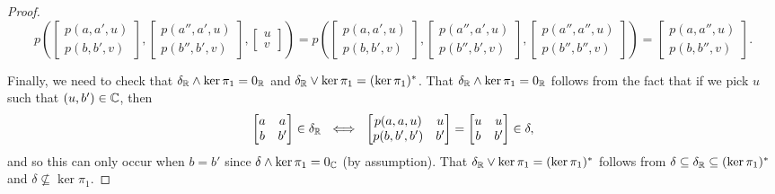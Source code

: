 \begin{appendices}
\begin{proof}
\[
p\left(\begin{bmatrix} p(a,a',u)\\ p(b,b',v)\end{bmatrix}, \begin{bmatrix} p(a'',a',u)\\ p(b'',b',v)\end{bmatrix}, \begin{bmatrix} u\\ v\end{bmatrix}\right) = p\left(\begin{bmatrix} p(a,a',u)\\ p(b,b',v)\end{bmatrix}, \begin{bmatrix} p(a'',a',u)\\ p(b'',b',v)\end{bmatrix}, \begin{bmatrix} p(a'',a'',u)\\ p(b'',b'',v)\end{bmatrix}\right) = \begin{bmatrix} p(a,a'',u)\\ p(b,b'',v)\end{bmatrix}.
\]

Finally, we need to check that $\delta_{\mathbb{R}} \wedge \ker \pi_1 = 0_{\mathbb{R}}$ and $\delta_{\mathbb{R}} \vee \ker \pi_1 = (\ker \pi_1)^*$. That $\delta_{\mathbb{R}} \wedge \ker \pi_1 = 0_{\mathbb{R}}$ follows from the fact that if we pick $u$ such that $(u,b') \in \mathbb{C}$, then
\[
\begin{bmatrix} a & a\\ b & b'\end{bmatrix} \in \delta_{\mathbb{R}}\ \iff\ \begin{bmatrix} p(a,a,u) & u\\ p(b,b',b') & b'\end{bmatrix} = \begin{bmatrix} u & u\\ b & b'\end{bmatrix} \in \delta,
\]
and so this can only occur when $b = b'$ since $\delta \wedge \ker \pi_1 = 0_{\mathbb{C}}$ (by assumption). That $\delta_{\mathbb{R}} \vee \ker \pi_1 = (\ker \pi_1)^*$ follows from $\delta \subseteq \delta_{\mathbb{R}} \subseteq (\ker \pi_1)^*$ and $\delta \not\subseteq \ker \pi_1$.
\end{proof}


\end{appendices}

